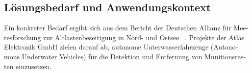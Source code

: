 \begin{otherlanguage}{ngerman}
\section{Lösungsbedarf und Anwendungskontext}

Ein konkreter Bedarf ergibt sich aus dem Bericht der \gls{Deutschen Allianz für Meeresforschung} zur Altlastenbeseitigung in Nord- und Ostsee ~\parencite{dam2024}. Projekte der Atlas Elektronik GmbH zielen darauf ab, autonome Unterwasserfahrzeuge (\gls{Autonomous Underwater Vehicle}s) für die Detektion und Entfernung von Munitionsresten einzusetzen. 
\end{otherlanguage}
